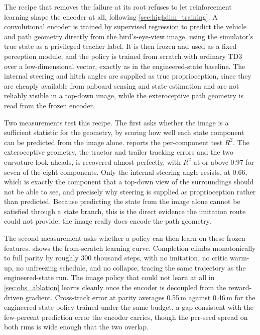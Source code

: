 The recipe that removes the failure at its root refuses to let reinforcement learning shape the encoder at all, following \cref{sec:highdim_training}. A convolutional encoder is trained by supervised regression to predict the vehicle and path geometry directly from the bird's-eye-view image, using the simulator's true state as a privileged teacher label. It is then frozen and used as a fixed perception module, and the policy is trained from scratch with ordinary TD3 over a low-dimensional vector, exactly as in the engineered-state baseline. The internal steering and hitch angles are supplied as true proprioception, since they are cheaply available from onboard sensing and state estimation and are not reliably visible in a top-down image, while the exteroceptive path geometry is read from the frozen encoder.

Two measurements test this recipe. The first asks whether the image is a sufficient statistic for the geometry, by scoring how well each state component can be predicted from the image alone.  reports the per-component test $R^2$. The exteroceptive geometry, the tractor and trailer tracking errors and the two curvature look-aheads, is recovered almost perfectly, with $R^2$ at or above 0.97 for seven of the eight components. Only the internal steering angle resists, at 0.66, which is exactly the component that a top-down view of the surroundings should not be able to see, and precisely why steering is supplied as proprioception rather than predicted. Because predicting the state from the image alone cannot be satisfied through a state branch, this is the direct evidence the imitation route could not provide, the image really does encode the path geometry.



The second measurement asks whether a policy can then learn on these frozen features.  shows the from-scratch learning curve. Completion climbs monotonically to full parity by roughly 300 thousand steps, with no imitation, no critic warm-up, no unfreezing schedule, and no collapse, tracing the same trajectory as the engineered-state run. The image policy that could not learn at all in \cref{sec:obs_ablation} learns cleanly once the encoder is decoupled from the reward-driven gradient. Cross-track error at parity averages 0.55\,m against 0.46\,m for the engineered-state policy trained under the same budget, a gap consistent with the few-percent prediction error the encoder carries, though the per-seed spread on both runs is wide enough that the two overlap.

